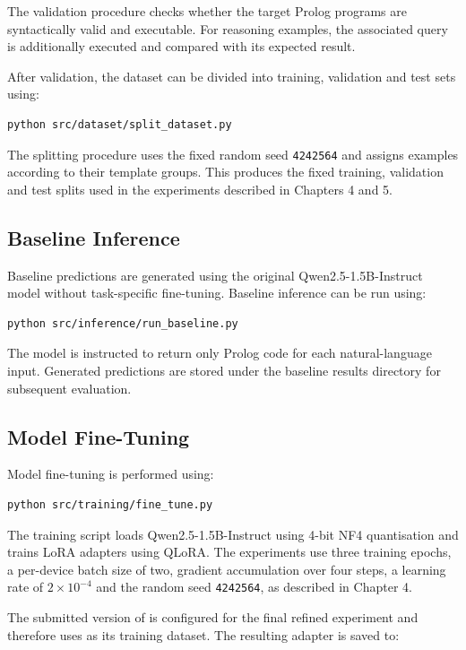 \documentclass[11pt]{article} %
\theoremstyle{plain}
\theoremstyle{definition}
\begin{document}
The validation procedure checks whether the target Prolog programs are
syntactically valid and executable. For reasoning examples, the associated
query is additionally executed and compared with its expected result.

After validation, the dataset can be divided into training, validation and
test sets using:

\begin{lstlisting}
python src/dataset/split_dataset.py
\end{lstlisting}

The splitting procedure uses the fixed random seed \texttt{4242564} and
assigns examples according to their template groups. This produces the fixed
training, validation and test splits used in the experiments described in
Chapters 4 and 5.


\subsection{Baseline Inference}

Baseline predictions are generated using the original
Qwen2.5-1.5B-Instruct model without task-specific fine-tuning. Baseline
inference can be run using:

\begin{lstlisting}
python src/inference/run_baseline.py
\end{lstlisting}

The model is instructed to return only Prolog code for each natural-language
input. Generated predictions are stored under the baseline results directory
for subsequent evaluation.


\subsection{Model Fine-Tuning}

Model fine-tuning is performed using:

\begin{lstlisting}
python src/training/fine_tune.py
\end{lstlisting}

The training script loads Qwen2.5-1.5B-Instruct using 4-bit NF4
quantisation and trains LoRA adapters using QLoRA. The experiments use three
training epochs, a per-device batch size of two, gradient accumulation over
four steps, a learning rate of $2\times10^{-4}$ and the random seed
\texttt{4242564}, as described in Chapter 4.

The submitted version of  is configured for
the final refined experiment and therefore uses
 as its training dataset. The resulting
adapter is saved to:
\end{document}
